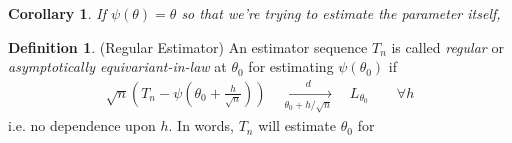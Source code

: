 \documentclass[12pt]{article}
\theoremstyle{plain}
\newtheorem{cor}[thm]{Corollary}
\theoremstyle{definition}
\newtheorem{defn}[thm]{Definition}
\theoremstyle{remark}
\newcommand{\dto}{\xrightarrow{d}}
\begin{document}
\begin{cor}
If $\psi(\theta)=\theta$ so that we're trying to estimate the parameter
itself,
\end{cor}


\begin{defn}(Regular Estimator)
An estimator sequence $T_n$ is called \emph{regular} or
\emph{asymptotically equivariant-in-law} at $\theta_0$ for
estimating $\psi(\theta_0)$ if
\begin{align*}
  \sqrt{n}
  \left(
  T_n
  -
  \psi\left(
  \theta_0 + \frac{h}{\sqrt{n}}
  \right)
  \right)
  \quad\underset{\theta_0+h/\sqrt{n}}{\dto}\quad
  L_{\theta_0}
  \qquad
  \forall h
\end{align*}
i.e. no dependence upon $h$.
In words, $T_n$ will estimate $\theta_0$ for
\end{defn}
\end{document}
